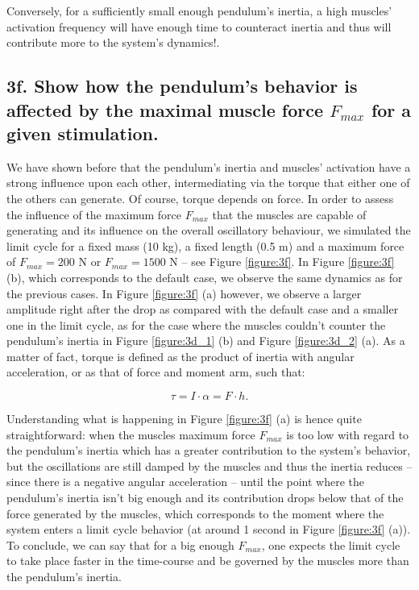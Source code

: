 \documentclass{cmc}
\begin{document}
Conversely, for a sufficiently small enough pendulum's inertia, a high muscles' activation frequency will have enough time to counteract inertia and thus will contribute more to the system's dynamics!.

\subsection*{3f. Show how the pendulum's behavior is affected by the
  maximal muscle force $F_{max}$ for a given stimulation.}
\label{sec:3f}

We have shown before that the pendulum's inertia and muscles' activation have a strong influence upon each other, intermediating via the torque that either one of the others can generate. Of course, torque depends on force. In order to assess the influence of the maximum force $F_{max}$ that the muscles are capable of generating and its influence on the overall oscillatory behaviour, we simulated the limit cycle for a fixed mass (10 kg), a fixed length (0.5 m) and a maximum force of $F_{max} = 200$ N or $F_{max} = 1500$ N -- see Figure \ref{figure:3f}. In Figure \ref{figure:3f} (b), which corresponds to the default case, we observe the same dynamics as for the previous cases. In Figure \ref{figure:3f} (a) however, we observe a larger amplitude right after the drop as compared with the default case and a smaller one in the limit cycle, as for the case where the muscles couldn't counter the pendulum's inertia in Figure \ref{figure:3d_1} (b) and Figure \ref{figure:3d_2} (a). As a matter of fact, torque is defined as the product of inertia with angular acceleration, or as that of force and moment arm, such that:

\begin{equation}
\tau = I\cdot\alpha = F\cdot h.
\end{equation}

Understanding what is happening in Figure \ref{figure:3f} (a) is hence quite straightforward: when the muscles maximum force $F_{max}$ is too low with regard to the pendulum's inertia which has a greater contribution to the system's behavior, but the oscillations are still damped by the muscles and thus the inertia reduces -- since there is a negative angular acceleration -- until the point where the pendulum's inertia isn't big enough and its contribution  drops below that of the force generated by the muscles, which corresponds to the moment where the system enters a limit cycle behavior (at around 1 second in Figure \ref{figure:3f} (a)). To conclude, we can say that for a big enough $F_{max}$, one expects the limit cycle to take place faster in the time-course and be governed by the muscles more than the pendulum's inertia. 
\end{document}

